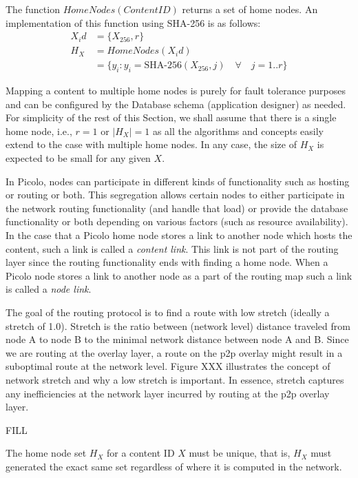 The function \(HomeNodes(ContentID)\) returns a set of home nodes. An implementation of this function using SHA-256 is as follows:
\begin{align}
    X_id &= \{X_{256}, r\} \\
    H_X &= HomeNodes(X_id) \\
        &= \{ y_i : y_i = \textrm{SHA-256}(X_{256}, j) \quad \forall \quad j = 1 .. r\}
\end{align}

Mapping a content to multiple home nodes is purely for fault tolerance purposes and can be configured by the Database
schema (application designer) as needed. For simplicity of the rest of this Section, we shall assume that there is a
single home node, i.e., \( r = 1\) or \( |H_X| = 1\) as all the algorithms and concepts easily extend to the case with
multiple home nodes.  In any case, the size of \( H_X \) is expected to be small for any given \(X\).

In Picolo, nodes can participate in different kinds of functionality such as hosting or routing or both. This
segregation allows certain nodes to either participate in the network routing functionality (and handle that load) or
provide the database functionality or both depending on various factors (such as resource availability). In the case
that a Picolo home node stores a link to another node which hosts the content, such a link is called a {\em content
link}. This link is not part of the routing layer since the routing functionality ends with finding a home node. When a
Picolo node stores a link to another node as a part of the routing map such a link is called a {\em node link}.

The goal of the routing protocol is to find a route with low stretch (ideally a stretch of 1.0). Stretch is the ratio
between (network level) distance traveled from node A to node B to the minimal network distance between node A and B.
Since we are routing at the overlay layer, a route on the p2p overlay might result in a suboptimal route at the network
level. Figure XXX illustrates the concept of network stretch and why a low stretch is important. In essence, stretch
captures any inefficiencies at the network layer incurred by routing at the p2p overlay layer.

FILL

\begin{property} The home node set \(H_X\) for a content ID \(X\) must be unique, that is,
    \(H_X\) must generated the exact same set regardless of where it is computed in the network.
\label{property_unique_home}
\end{property}

